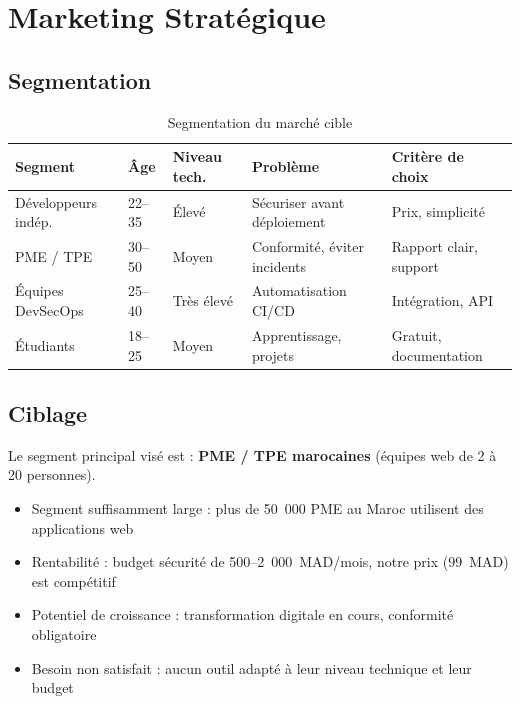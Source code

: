 \documentclass[12pt,a4paper]{report}
\newcommand{\hdr}[1]{\cellcolor{gray!15}\textbf{#1}}
\newcommand{\rowA}{\rowcolor{gray!8}}
\begin{document}
\section{Marketing Stratégique}

\subsection{Segmentation}

\begin{table}[H]
\centering
\caption{Segmentation du marché cible}
\begin{tabular}{p{3cm}p{2cm}p{2.5cm}p{2.5cm}p{2.5cm}}
\toprule
\hdr{Segment} & \hdr{Âge} & \hdr{Niveau tech.} & \hdr{Problème} & \hdr{Critère de choix} \\
\midrule
Développeurs indép. & 22--35 & Élevé & Sécuriser avant déploiement & Prix, simplicité \\
\rowA PME / TPE & 30--50 & Moyen & Conformité, éviter incidents & Rapport clair, support \\
Équipes DevSecOps & 25--40 & Très élevé & Automatisation CI/CD & Intégration, API \\
\rowA Étudiants & 18--25 & Moyen & Apprentissage, projets & Gratuit, documentation \\
\bottomrule
\end{tabular}
\end{table}

\subsection{Ciblage}

Le segment principal visé est : \textbf{PME / TPE marocaines} (équipes web de 2 à 20 personnes).

\begin{itemize}
  \item Segment suffisamment large : plus de 50~000 PME au Maroc utilisent des applications web
  \item Rentabilité : budget sécurité de 500--2~000~MAD/mois, notre prix (99~MAD) est compétitif
  \item Potentiel de croissance : transformation digitale en cours, conformité obligatoire
  \item Besoin non satisfait : aucun outil adapté à leur niveau technique et leur budget
\end{itemize}
\end{document}
